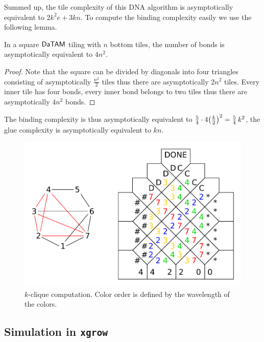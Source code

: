 Summed up, the tile complexity of this DNA algorithm is asymptotically equivalent to $2 k^2 e + 3 kn$. To compute the binding complexity easily we use the following lemma.

\begin{lemma}
	In a square $\mathsf{DaTAM}$ tiling with $n$ bottom tiles, the number of bonds is asymptotically equivalent to $4 n^2$.
\end{lemma}
\begin{proof}
	Note that the square can be divided by diagonals into four triangles consisting of asymptotically $\frac{n^2}{2}$ tiles thus there are asymptotically $2n^2$ tiles. Every inner tile has four bonds, every inner bond belongs to two tiles thus there are asymptotically $4n^2$ bonds.
\end{proof}

The binding complexity is thus asymptotically equivalent to $\nicefrac{5}{4} \cdot 4 \bigl(\frac{k}{2}\bigr)^2 = \nicefrac{5}{4}\,k^2$, the glue complexity is asymptotically equivalent to $kn$.

\begin{figure}[H]
\begin{center}
	\includegraphics[scale=0.75]{./figures/k-clique/k-clique.pdf}
	\caption{$k$-clique computation. Color order is defined by the wavelength of the colors.}
	\label{fig:k-clique}
\end{center}
\end{figure}

\subsection{Simulation in {\tt xgrow}}
\label{sec:xgrow}

